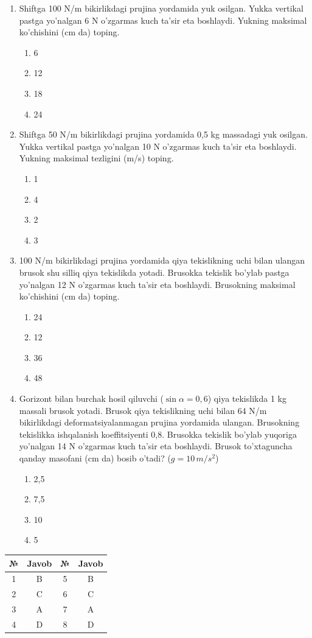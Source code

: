 \begin{enumerate}
\item Shiftga 100 N/m bikirlikdagi prujina yordamida yuk osilgan. Yukka vertikal pastga yo’nalgan 6 N o’zgarmas kuch ta’sir eta boshlaydi. Yukning maksimal ko’chishini (cm da) toping.
\begin{enumerate}[label=\Alph*)]
\item 6
\item 12
\item 18
\item 24
\end{enumerate}

\item Shiftga 50 N/m bikirlikdagi prujina yordamida 0,5 kg massadagi yuk osilgan. Yukka vertikal pastga yo’nalgan 10 N o’zgarmas kuch ta’sir eta boshlaydi. Yukning maksimal tezligini (m/s) toping.
\begin{enumerate}[label=\Alph*)]
\item 1
\item 4
\item 2
\item 3
\end{enumerate}

\item 100 N/m bikirlikdagi prujina yordamida qiya tekislikning uchi bilan ulangan brusok shu silliq qiya tekislikda yotadi. Brusokka tekislik bo’ylab pastga yo’nalgan 12 N o’zgarmas kuch ta’sir eta boshlaydi. Brusokning maksimal ko’chishini (cm da) toping.
\begin{enumerate}[label=\Alph*)]
\item 24
\item 12
\item 36
\item 48
\end{enumerate}

\item Gorizont bilan burchak hosil qiluvchi ($\sin \alpha = 0,6$) qiya tekislikda 1 kg massali brusok yotadi. Brusok qiya tekislikning uchi bilan 64 N/m bikirlikdagi deformatsiyalanmagan prujina yordamida ulangan. Brusokning tekislikka ishqalanish koeffitsiyenti 0,8. Brusokka tekislik bo’ylab yuqoriga yo’nalgan 14 N o’zgarmas kuch ta’sir eta boshlaydi. Brusok to’xtaguncha qanday masofani (cm da) bosib o’tadi? ($g = 10 \, m/s^2$)
\begin{enumerate}[label=\Alph*)]
\item 2,5
\item 7,5
\item 10
\item 5
\end{enumerate}

\end{enumerate}



\begin{table}[h!]
\centering
\begin{tabular}{|c|c|c|c|}
\hline
\textbf{№} & \textbf{Javob} & \textbf{№} & \textbf{Javob} \\ \hline
1 & B & 5 & B \\ \hline
2 & C & 6 & C \\ \hline
3 & A & 7 & A \\ \hline
4 & D & 8 & D \\ \hline
\end{tabular}
\end{table}